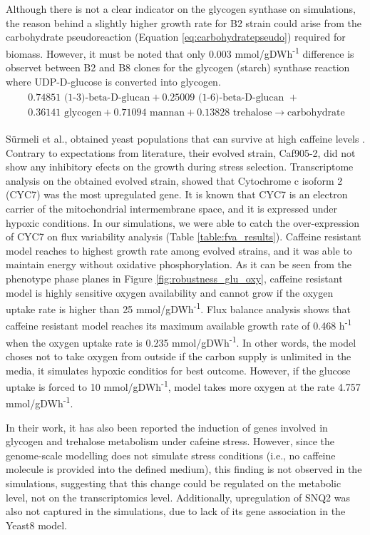 Although there is not a clear indicator on the glycogen synthase on simulations, the reason behind a slightly higher growth rate for B2 strain could arise from the carbohydrate pseudoreaction (Equation \ref{eq:carbohydratepseudo}) required for biomass. However, it must be noted that only 0.003 mmol/gDWh\textsuperscript{-1} difference is observet between B2 and B8 clones for the glycogen (starch) synthase reaction where UDP-D-glucose is converted into glycogen.
\begin{align}
\begin{split}
\label{eq:carbohydratepseudo}
\  0.74851 \text{ (1-3)-beta-D-glucan} + 0.25009 \text{ (1-6)-beta-D-glucan } + \\
\ 0.36141 \text{ glycogen} + 0.71094 \text{ mannan} + 0.13828 \text{ trehalose} \xrightarrow{}  \text{carbohydrate}
\end{split}
\end{align}

Sürmeli et al., obtained yeast populations that can survive at high caffeine levels \cite{Srmeli2019}. Contrary to expectations from literature, their evolved strain, Caf905-2, did not show any inhibitory efects on the growth during stress selection. Transcriptome analysis on the obtained evolved strain, showed that Cytochrome c isoform 2 (CYC7) was the most upregulated gene. It is known that CYC7 is an electron carrier of the mitochondrial intermembrane space, and it is expressed under hypoxic conditions. In our simulations, we were able to catch the over-expression of CYC7 on flux variability analysis (Table \ref{table:fva_results}). Caffeine resistant model reaches to highest growth rate among evolved strains, and it was able to maintain energy without oxidative phosphorylation. As it can be seen from the phenotype phase planes in Figure \ref{fig:robustness_glu_oxy}, caffeine resistant model is highly sensitive oxygen availability and cannot grow if the oxygen uptake rate is higher than 25 mmol/gDWh\textsuperscript{-1}. Flux balance analysis shows that caffeine resistant model reaches its maximum available growth rate of 0.468 h\textsuperscript{-1} when the oxygen uptake rate is 0.235 mmol/gDWh\textsuperscript{-1}. In other words, the model choses not to take oxygen from outside if the carbon supply is unlimited in the media, it simulates hypoxic conditios for best outcome. However, if the glucose uptake is forced to 10 mmol/gDWh\textsuperscript{-1}, model takes more oxygen at the rate 4.757 mmol/gDWh\textsuperscript{-1}.

In their work, it has also been reported the induction of genes involved in glycogen and trehalose metabolism under cafeine stress. However, since the genome-scale modelling does not simulate stress conditions (i.e., no caffeine molecule is provided into the defined medium), this finding is not observed in the simulations, suggesting that this change could be regulated on the metabolic level, not on the transcriptomics level. Additionally, upregulation of SNQ2 was also not captured in the simulations, due to lack of its gene association in the Yeast8 model.

